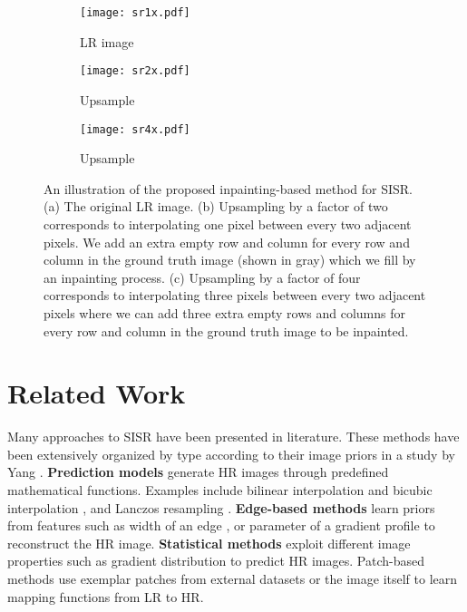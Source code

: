 \documentclass[10pt,twocolumn,letterpaper]{article}
\begin{document}
\begin{figure}[h]
	\centering
	\begin{subfigure}{.14\textwidth}
		\centering
		\texttt{[image: sr1x.pdf]}
		\caption{LR image}
	\end{subfigure}
	\begin{subfigure}{.14\textwidth}
		\centering
		\texttt{[image: sr2x.pdf]}
		\caption{Upsample }
	\end{subfigure}
	\begin{subfigure}{.14\textwidth}
		\centering
		\texttt{[image: sr4x.pdf]}
		\caption{Upsample }
	\end{subfigure}
	\caption{An illustration of the proposed inpainting-based method for SISR. (a) The original LR image. (b) Upsampling by a factor of two corresponds to interpolating one pixel between every two adjacent pixels. We add an extra empty row and column for every row and column in the ground truth image (shown in gray) which we fill by an inpainting process. (c) Upsampling by a factor of four corresponds to interpolating three pixels between every two adjacent pixels where we can add three extra empty rows and columns for every row and column in the ground truth image to be inpainted.}
	\label{fig:sr_inpainting}
\end{figure}

\section{Related Work}
Many approaches to SISR have been presented in literature. These methods have been extensively organized by type according to their image priors in a study by Yang \etal \cite{yang2014single}. \textbf{Prediction models} generate HR images through predefined mathematical functions. Examples include bilinear interpolation and bicubic interpolation \cite{de1978practical}, and Lanczos resampling \cite{duchon1979lanczos}. \textbf{Edge-based methods} learn priors from features such as width of an edge \cite{fattal2007image}, or parameter of a gradient profile \cite{sun2008image} to reconstruct the HR image. \textbf{Statistical methods} exploit different image properties such as gradient distribution \cite{shan2008fast} to predict HR images. Patch-based methods use exemplar patches from external datasets \cite{chang2004super,freeman2002example} or the image itself \cite{irani2009super,freedman2011image} to learn mapping functions from LR to HR.
\end{document}
